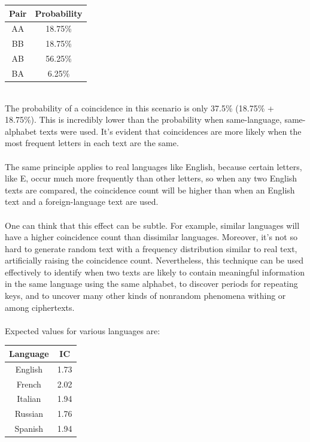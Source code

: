 \documentclass[Lau,binding=0.6cm,oneside]{sapthesis}
\begin{document}
\begin{center}
 \begin{tabular}{||c c||} 
 \hline
 Pair & Probability\\ [0.5ex] 
 \hline\hline
 AA & 18.75\% \\ 
 \hline
 BB & 18.75\% \\
 \hline
 AB & 56.25\% \\
 \hline
 BA & 6.25\% \\
 \hline
\end{tabular}
\end{center}
\ \\
The probability of a coincidence in this scenario is only 37.5\% (18.75\% + 18.75\%). This is incredibly lower than the probability when same-language, same-alphabet texts were used. It's evident that coincidences are more likely when the most frequent letters in each text are the same.\\\\
The same principle applies to real languages like English, because certain letters, like \textsf{E}, occur much more frequently than other letters, so when any two English texts are compared, the coincidence count will be higher than when an English text and a foreign-language text are used.\\\\
One can think that this effect can be subtle. For example, similar languages will have a higher coincidence count than dissimilar languages. Moreover, it's not so hard to generate random text with a frequency distribution similar to real text, artificially raising the coincidence count. Nevertheless, this technique can be used effectively to identify when two texts are likely to contain meaningful information in the same language using the same alphabet, to discover periods for repeating keys, and to uncover many other kinds of nonrandom phenomena withing or among ciphertexts.\\\\
Expected values for various languages are:\\

\begin{center}
 \begin{tabular}{||c c||} 
 \hline
 Language & IC\\ [0.5ex] 
 \hline\hline
 English & 1.73 \\ 
 \hline
 French & 2.02 \\
 \hline
 Italian & 1.94 \\
 \hline
 Russian & 1.76 \\
 \hline
 Spanish & 1.94 \\
 \hline
\end{tabular}
\end{center}
\ \\
\end{document}
